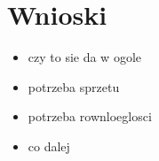\section{Wnioski}\label{conclusion}

\begin{itemize}
\item czy to sie da w ogole
\item potrzeba sprzetu
\item potrzeba rownloeglosci
\item co dalej
\end{itemize}
